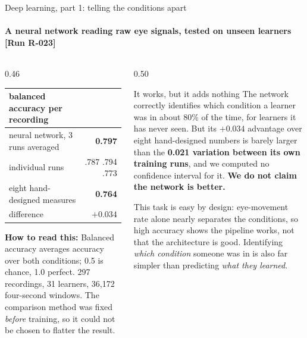 \documentclass[aspectratio=169,10pt]{beamer}
\makeatletter
\newcommand{\runtag}[1]{{\scriptsize\color{mubeamer@gray7}[#1]}}
\newcommand{\sidenote}[1]{{\scriptsize\color{mubeamer@gray7}\sloppy\par#1\par}}
\newcommand{\reads}[1]{\textbf{How to read this:} #1}
\makeatother
\begin{document}
\begin{frame}{Deep learning, part 1: telling the conditions apart}
  \framesubtitle{A neural network reading raw eye signals, tested on unseen learners \runtag{Run R-023}}
  \begin{columns}[T]
    \begin{column}{0.46\textwidth}
      \scriptsize
      \begin{tabular}{@{}lr@{}}
        \toprule
        balanced accuracy per recording & \\
        \midrule
        neural network, 3 runs averaged & \textbf{0.797} \\
        \quad individual runs           & .787 .794 .773 \\
        eight hand-designed measures    & \textbf{0.764} \\
        \midrule
        difference             & $+0.034$ \\
        \bottomrule
      \end{tabular}

      \vspace{0.5em}
      \sidenote{\reads{Balanced accuracy averages accuracy over both
      conditions; 0.5 is chance, 1.0 perfect. 297 recordings, 31 learners,
      36{,}172 four-second windows. The comparison method was fixed
      \emph{before} training, so it could not be chosen to flatter the
      result.}}
    \end{column}
    \begin{column}{0.50\textwidth}
      \begin{block}{It works, but it adds nothing}
        \small
        The network correctly identifies which condition a learner was in
        about 80\% of the time, for learners it has never seen. But its
        $+0.034$ advantage over eight hand-designed numbers is barely larger
        than the \textbf{0.021 variation between its own training runs}, and
        we computed no confidence interval for it. \textbf{We do not claim the
        network is better.}
      \end{block}
      \sidenote{This task is easy by design: eye-movement rate alone nearly
      separates the conditions, so high accuracy shows the pipeline works, not
      that the architecture is good. Identifying \emph{which condition}
      someone was in is also far simpler than predicting \emph{what they
      learned}.}
    \end{column}
  \end{columns}
\end{frame}
\end{document}
